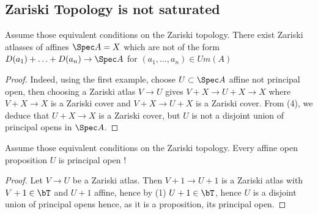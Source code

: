 \subsection{Zariski Topology is not saturated}
\begin{example}{\label{ex:weirdZarAtlasses}}
	Assume those equivalent conditions on the Zariski topology.
	There exist Zariski atlasses of affines $\Spec A = X$ which are not of the form $D(a_1) + \hdots + D(a_n) \to \Spec A$ for $(a_1,\hdots,a_n) \in Um(A)$
\end{example}
\begin{proof}
	Indeed, using the first example, choose $U \subset \Spec A$ affine not principal open, then choosing a Zariski atlas $V \to U$ gives $V + X \to U + X \to X$ where $V + X \to X$ is a Zariski cover and $V + X \to U + X $ is a Zariski cover.
	From (4), we deduce that $U +X \to X$ is a Zariski cover, but $U$ is not a disjoint union of principal opens in $\Spec A$. 
\end{proof}
\begin{example}
	Assume those equivalent conditions on the Zariski topology. Every affine open proposition $U$ is principal open !
\end{example}
\begin{proof}
	Let $V \to U$ be a Zariski atlas. Then $V +1  \to U + 1$ is a Zariski atlas with $V+1 \in \bT$ and $U + 1$ affine, hence by (1) $U+ 1 \in \bT$, hence $U$ is a disjoint union of principal opens hence, as it is a proposition, its principal open.
\end{proof}



